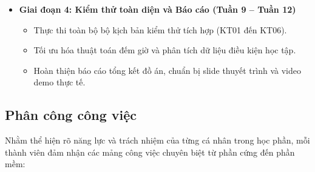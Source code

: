 \begin{itemize}[leftmargin=0.8cm]
    \item \textbf{Giai đoạn 4: Kiểm thử toàn diện và Báo cáo (Tuần 9 – Tuần 12)}
    \begin{itemize}
        \item Thực thi toàn bộ bộ kịch bản kiểm thử tích hợp (KT01 đến KT06).
        \item Tối ưu hóa thuật toán đếm giờ và phân tích dữ liệu điều kiện học tập.
        \item Hoàn thiện báo cáo tổng kết đồ án, chuẩn bị slide thuyết trình và video demo thực tế.
    \end{itemize}
\end{itemize}

\subsection{Phân công công việc}

Nhằm thể hiện rõ năng lực và trách nhiệm của từng cá nhân trong học phần, mỗi thành viên đảm nhận các mảng công việc chuyên biệt từ phần cứng đến phần mềm:

